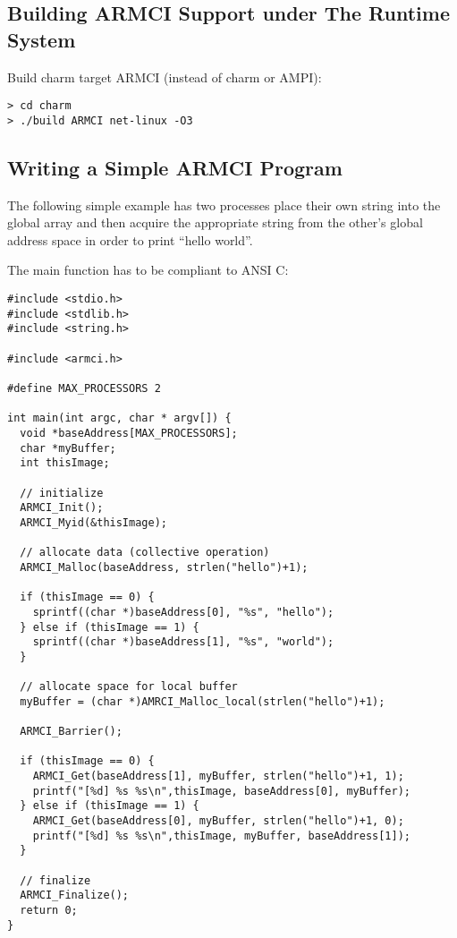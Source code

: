 \documentclass[10pt]{article}
\begin{document}
\subsection{Building ARMCI Support under The \charmpp{} Runtime System}
\label{sec::charm build}

Build charm target ARMCI (instead of charm or AMPI):
\begin{verbatim}
> cd charm
> ./build ARMCI net-linux -O3
\end{verbatim}

\subsection{Writing a Simple ARMCI Program}
\label{sec::simple program}

The following simple example has two processes place their own string
into the global array and then acquire the appropriate string from the
other's global address space in order to print ``hello world''. 

The main function has to be compliant to ANSI C:

\begin{verbatim}
#include <stdio.h>
#include <stdlib.h>
#include <string.h>

#include <armci.h>

#define MAX_PROCESSORS 2

int main(int argc, char * argv[]) {
  void *baseAddress[MAX_PROCESSORS];
  char *myBuffer;
  int thisImage;
  
  // initialize
  ARMCI_Init();
  ARMCI_Myid(&thisImage);

  // allocate data (collective operation)
  ARMCI_Malloc(baseAddress, strlen("hello")+1);
 
  if (thisImage == 0) {
    sprintf((char *)baseAddress[0], "%s", "hello");
  } else if (thisImage == 1) {
    sprintf((char *)baseAddress[1], "%s", "world");
  }

  // allocate space for local buffer
  myBuffer = (char *)AMRCI_Malloc_local(strlen("hello")+1);
  
  ARMCI_Barrier();

  if (thisImage == 0) {
    ARMCI_Get(baseAddress[1], myBuffer, strlen("hello")+1, 1);
    printf("[%d] %s %s\n",thisImage, baseAddress[0], myBuffer);
  } else if (thisImage == 1) {
    ARMCI_Get(baseAddress[0], myBuffer, strlen("hello")+1, 0);
    printf("[%d] %s %s\n",thisImage, myBuffer, baseAddress[1]);
  }

  // finalize
  ARMCI_Finalize();
  return 0;
}
\end{verbatim}
\end{document}
